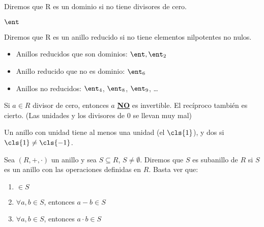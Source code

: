 \begin{defn}
Diremos que R es un dominio si no tiene divisores de cero.
\end{defn}

\begin{example}
	$\ent$
\end{example}

\begin{defn}\label{def:AnilloReducido}
Diremos que R es un anillo reducido si no tiene elementos nilpotentes no nulos.
\end{defn}

\begin{example}
	\begin{itemize}
		\item Anillos reducidos que son dominios: $\ent, \ent_2$
		\item Anillo reducido que no es dominio: $\ent_6$
		\item Anillos no reducidos: $\ent_4$, $\ent_8$, $\ent_9$, \dots
	\end{itemize}
\end{example}


\obs Si $a \in R$ divisor de cero, entonces $a$ \underline{\bf NO} es invertible. El recíproco también es cierto. (Las unidades y los divisores de 0 se llevan muy mal)

\obs Un anillo con unidad tiene al menos una unidad (el $\cls{1}$), y dos si $\cls{1} \neq \cls{-1}$. %

\begin{defn}[Subanillo]
Sea $(R,+,\cdot)$ un anillo y sea $S \subseteq R$, $S \neq \emptyset$. Diremos que $S$ es subanillo de $R$ si $S$ es un anillo con las operaciones definidas en $R$. Basta ver que:
\begin{enumerate}
	\item \one $\in S$
	\item $\forall a,b \in S$, entonces $a-b \in S$
	\item $\forall a,b \in S$, entonces $a\cdot b \in S$
\end{enumerate}
\end{defn}



